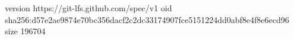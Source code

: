 version https://git-lfs.github.com/spec/v1
oid sha256:d57e2ae9874e70bc356dacf2c2dc33174907fce5151224dd0abf8e4f8e6ecd96
size 196704

